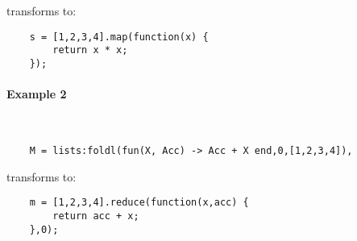 transforms to:

\begin{lstlisting}
    s = [1,2,3,4].map(function(x) {
        return x * x;
    });
\end{lstlisting}

\paragraph{\bf Example 2}\

\vspace{1\baselineskip}
\begin{lstlisting}
    M = lists:foldl(fun(X, Acc) -> Acc + X end,0,[1,2,3,4]),
\end{lstlisting}

transforms to:

\begin{lstlisting}
    m = [1,2,3,4].reduce(function(x,acc) {
        return acc + x;
    },0);
\end{lstlisting}
